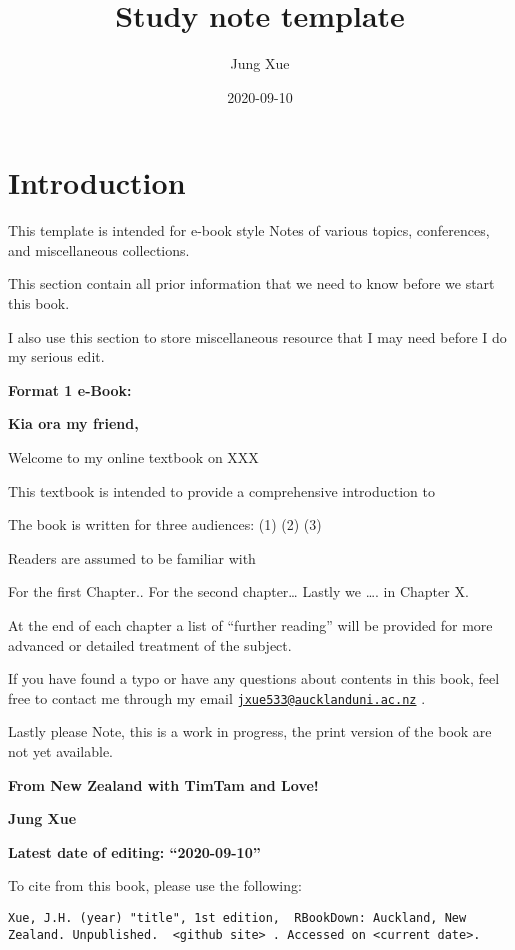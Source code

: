\documentclass[
]{book}
\title{Study note template}
\author{Jung Xue}
\date{2020-09-10}
\begin{document}
\maketitle

{
\setcounter{tocdepth}{1}
\tableofcontents
}
\hypertarget{introduction}{%
\chapter*{Introduction}\label{introduction}}

This template is intended for e-book style Notes of various topics, conferences, and miscellaneous collections.

This section contain all prior information that we need to know before we start this book.

I also use this section to store miscellaneous resource that I may need before I do my serious edit.

\textbf{Format 1 e-Book:}

\textbf{Kia ora my friend,}

Welcome to my online textbook on XXX

This textbook is intended to provide a comprehensive introduction to

The book is written for three audiences: (1) (2) (3)

Readers are assumed to be familiar with

For the first Chapter.. For the second chapter\ldots{} Lastly we \ldots{}. in Chapter X.

At the end of each chapter a list of ``further reading'' will be provided for more advanced or detailed treatment of the subject.

If you have found a typo or have any questions about contents in this book, feel free to contact me through my email \href{mailto:jxue533@aucklanduni.ac.nz}{\nolinkurl{jxue533@aucklanduni.ac.nz}} .

Lastly please Note, this is a work in progress, the print version of the book are not yet available.

\textbf{From New Zealand with TimTam and Love!}

\textbf{Jung Xue}

\textbf{Latest date of editing: ``2020-09-10''}

To cite from this book, please use the following:

\begin{verbatim}
Xue, J.H. (year) "title", 1st edition,  RBookDown: Auckland, New Zealand. Unpublished.  <github site> . Accessed on <current date>.
\end{verbatim}
\end{document}
